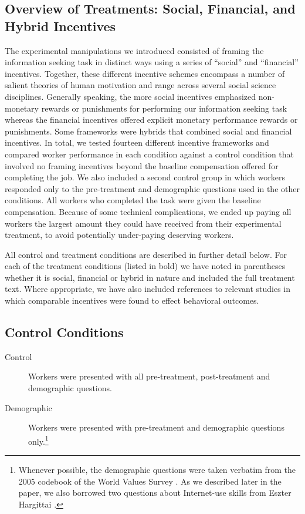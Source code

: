 \documentclass{chi2009}
\begin{document}
{\subsection{Overview of Treatments: Social, Financial, and Hybrid Incentives}

The experimental manipulations we introduced consisted of framing the
information seeking task in distinct ways using a series of ``social''
and ``financial'' incentives. Together, these different incentive
schemes encompass a number of salient theories of human motivation and
range across several social science disciplines. Generally speaking,
the more social incentives emphasized non-monetary rewards or
punishments for performing our information seeking task whereas the
financial incentives offered explicit monetary performance rewards or
punishments. Some frameworks were hybrids that combined social and
financial incentives. In total, we tested fourteen different incentive
frameworks and compared worker performance in each condition against a
control condition that involved no framing incentives beyond the
baseline compensation offered for completing the job. We also included
a second control group in which workers responded only to the
pre-treatment and demographic questions used in the other
conditions. All workers who completed the task were given the baseline
compensation. Because of some technical complications, we ended up
paying all workers the largest amount they could have received from
their experimental treatment, to avoid potentially under-paying
deserving workers.

All control and treatment conditions are described in further detail
below. For each of the treatment conditions (listed in bold) we have
noted in parentheses whether it is social, financial or hybrid in
nature and included the full treatment text. Where appropriate, we
have also included references to relevant studies in which comparable
incentives were found to effect behavioral outcomes.

\subsection{Control Conditions} 

\begin{description}
\item[Control] Workers were presented with all pre-treatment, post-treatment and demographic questions.
\item[Demographic] Workers were presented with pre-treatment and demographic questions only.\footnote{Whenever possible, the demographic questions were taken verbatim from the 2005 codebook of the World Values Survey \cite{world_vals_survey2009}. As we described later in the paper, we also borrowed two questions about Internet-use skills from Eszter Hargittai \cite{hargittai2009update}.}
\end{description}

}
\end{document}
